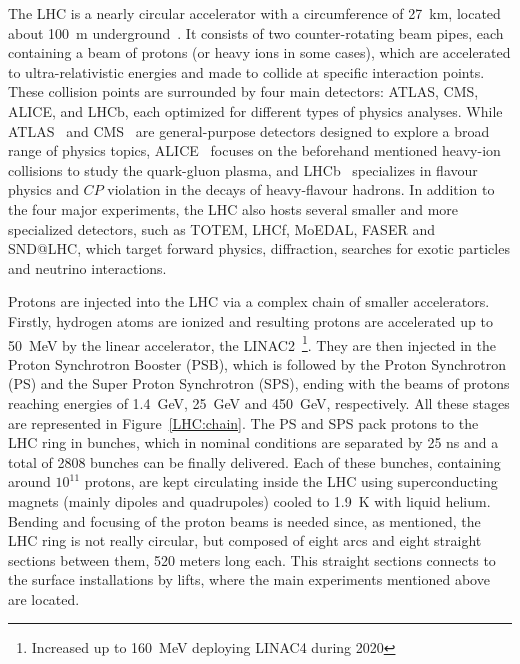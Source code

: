The LHC is a nearly circular accelerator with a circumference of 27~km, located about 100~m underground~\cite{Lyndon:Evans_2008}. It consists of two counter-rotating beam pipes, each containing a beam of protons (or heavy ions in some cases), which are accelerated to ultra-relativistic energies and made to collide at specific interaction points. These collision points are surrounded by four main detectors: ATLAS, CMS, ALICE, and LHCb, each optimized for different types of physics analyses. While ATLAS~\cite{ATLAS:exp} and CMS~\cite{CMS:exp} are general-purpose detectors designed to explore a broad range of physics topics, ALICE~\cite{ALICE:exp} focuses on the beforehand mentioned heavy-ion collisions to study the quark-gluon plasma, and LHCb~\cite{LHCb:exp} specializes in flavour physics and $CP$ violation in the decays of heavy-flavour hadrons. In addition to the four major experiments, the LHC also hosts several smaller and more specialized detectors, such as TOTEM, LHCf, MoEDAL, FASER and SND@LHC, which target forward physics, diffraction, searches for exotic particles and neutrino interactions.

Protons are injected into the LHC via a complex chain of smaller accelerators. Firstly, hydrogen atoms are ionized and resulting protons are accelerated up to 50~MeV by the linear accelerator, the LINAC2~\footnote{Increased up to 160~MeV deploying LINAC4 during 2020}. They are then injected in the Proton Synchrotron Booster (PSB), which is followed by the Proton Synchrotron (PS) and the Super Proton Synchrotron (SPS), ending with the beams of protons reaching energies of 1.4~GeV, 25~GeV and 450~GeV, respectively. All these stages are represented in Figure~\ref{LHC:chain}. The PS and SPS pack protons to the LHC ring in bunches, which in nominal conditions are separated by 25 ns and a total of 2808 bunches can be finally delivered. Each of these bunches, containing around $10^{11}$ protons, are kept circulating inside the LHC using superconducting magnets (mainly dipoles and quadrupoles) cooled to 1.9~K with liquid helium. Bending and focusing of the proton beams is needed since, as mentioned, the LHC ring is not really circular, 
but composed of eight arcs and eight straight sections between them, 520 meters long each. This straight sections connects to the surface installations by lifts, where the main experiments mentioned above are located.

